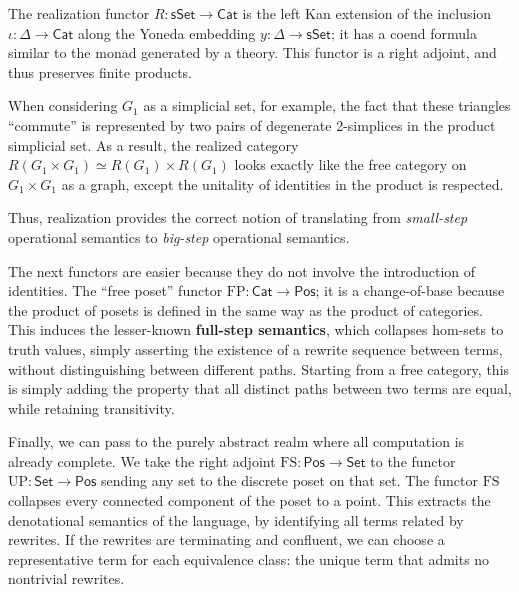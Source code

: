 \documentclass{amsart}
\theoremstyle{definition}
\newcommand{\sSet}{\mathsf{sSet}}
\newcommand{\RGph}{\mathsf{RGph}}
\newcommand{\Set}{\mathsf{Set}}
\newcommand{\Cat}{\mathsf{Cat}}
\newcommand{\Pos}{\mathsf{Pos}}
\newcommand{\FC}{\mathrm{FC}}
\newcommand{\FP}{\mathrm{FP}}
\newcommand{\FS}{\mathrm{FS}}
\newcommand{\UP}{\mathrm{UP}}
\newcommand{\maps}{\colon}
\begin{document}
The realization functor $R\maps \sSet\to \Cat$ is the left Kan extension of the inclusion $\iota\maps \Delta \to \Cat$ along the Yoneda embedding $y\maps \Delta\to \sSet$; it has a coend formula similar to the monad generated by a theory. This functor is a right adjoint, and thus preserves finite products.

When considering $G_1$ as a simplicial set, for example, the fact that these triangles ``commute'' is represented by two pairs of degenerate 2-simplices in the product simplicial set. As a result, the realized category $R(G_1\times G_1) \simeq R(G_1)\times R(G_1)$ looks exactly like the free category on $G_1\times G_1$ as a graph, except the unitality of identities in the product is respected.

Thus, realization provides the correct notion of translating from \emph{small-step} operational semantics to \emph{big-step} operational semantics.



The next functors are easier because they do not involve the introduction of identities. The ``free poset'' functor $\FP\maps \Cat \to \Pos$; it is a change-of-base because the product of posets is defined in the same way as the product of categories. This induces the lesser-known \textbf{full-step semantics}, which collapses hom-sets to truth values, simply asserting the existence of a rewrite sequence between terms, without distinguishing between different paths. Starting from a free category, this is simply adding the property that all distinct paths between two terms are equal, while retaining transitivity.

Finally, we can pass to the purely abstract realm where all computation is already complete. We take the right adjoint $\FS\maps \Pos \to \Set$ to the functor $\UP \maps \Set \to \Pos$ sending any set to the discrete poset on that set.
The functor $\FS$ collapses every connected component of the poset to a point.   This extracts
the denotational semantics of the language, by identifying all terms related by rewrites.  If the rewrites are terminating and confluent, we can choose a representative term for each equivalence class: the unique term that admits no nontrivial rewrites.
\end{document}
